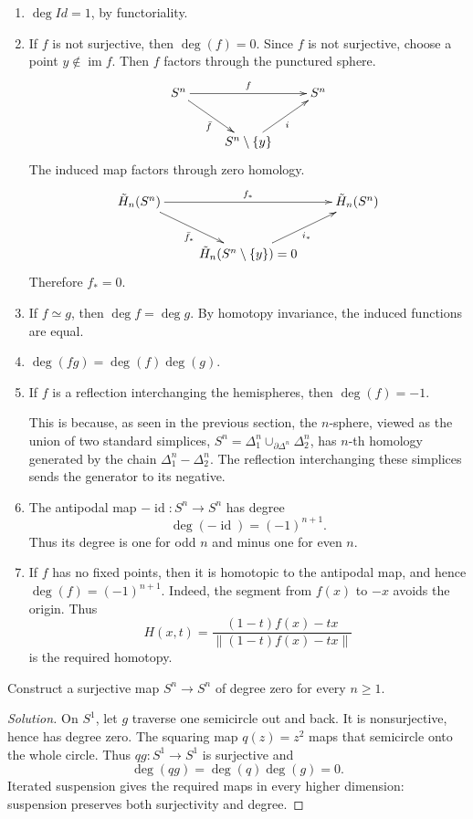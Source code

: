 \begin{proposition}
\begin{enumerate}
\item $\deg Id=1$, by functoriality.
\item If $f$ is not surjective, then
$\deg(f)=0$. Since $f$
is not surjective, choose a point
$y\notin\operatorname{im}f$. Then $f$ factors
through the punctured sphere.
$$
\xymatrix{
S^n \ar[rr]^f
  \ar[dr]_{\bar f}
  & & S^n \\
  & S^n\setminus\{y\}
    \ar[ur]_{i}
}
$$
The induced map factors through zero
homology.
$$
\xymatrix{
\tilde H_n(S^n) \ar[rr]^{f_*}
  \ar[dr]_{\bar f_*}
  & & \tilde H_n(S^n) \\
  & \tilde H_n(S^n\setminus\{y\})=0
    \ar[ur]_{i_*}
}
$$
Therefore $f_*=0$.
\item If $f\simeq g$, then $\deg f=\deg g$.
By homotopy
invariance, the induced functions are equal.
\item $\deg(fg)=\deg(f)\deg(g)$.
\item If $f$ is a reflection interchanging
the hemispheres,
then $\deg(f)=-1$.

This is because, as seen in the previous
section, the
$n$-sphere, viewed as the union of two
standard simplices,
$S^n=\Delta_1^n
\cup_{\partial\Delta^n}\Delta_2^n$,
has
$n$-th homology generated by the chain
$\Delta_1^n-\Delta_2^n$. The reflection
interchanging these
simplices sends the generator to its
negative.
\item The antipodal map
$-\operatorname{id}:S^n\to S^n$ has degree
$$
\deg(-\operatorname{id})=(-1)^{n+1}.
$$
Thus its degree is one for odd $n$ and minus
one for even $n$.
\item If $f$ has no fixed points, then it is
homotopic to the antipodal map, and hence
$\deg(f)=(-1)^{n+1}$. Indeed, the segment
from $f(x)$ to $-x$ avoids the origin. Thus
$$
H(x,t)=
\frac{(1-t)f(x)-tx}
{\lVert(1-t)f(x)-tx\rVert}
$$
is the required homotopy.
\end{enumerate}
\end{proposition}


\begin{exercise}
Construct a surjective map $S^n\to S^n$ of
degree zero for every $n\geq1$.
\end{exercise}

\begin{proof}[Solution]
On $S^1$, let $g$ traverse one semicircle out
and back. It is nonsurjective, hence has
degree
zero. The squaring map $q(z)=z^2$ maps that
semicircle onto the whole circle. Thus
$qg:S^1\to S^1$ is surjective and
$$
\deg(qg)=\deg(q)\deg(g)=0.
$$
Iterated suspension gives the required maps
in every higher dimension: suspension
preserves
both surjectivity and degree.
\end{proof}
